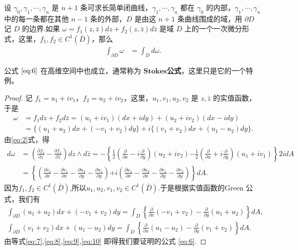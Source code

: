 \documentclass[../../main.tex]{subfiles}
\begin{document}
\begin{theorem}[Green公式]\label{theorem:Green公式-复变函数形式}
设 \( \gamma_0, \gamma_1, \cdots, \gamma_n \) 是 \( n + 1 \) 条可求长简单闭曲线，\( \gamma_1, \cdots, \gamma_n \) 都在 \( \gamma_0 \) 的内部，\( \gamma_1, \cdots, \gamma_n \) 中的每一条都在其他 \( n - 1 \) 条的外部，\( D \) 是由这 \( n + 1 \) 条曲线围成的域，用 \(\partial D \) 记 \( D \) 的边界.如果 \( \omega = f_1(z,\bar{z})dz + f_2(z,\bar{z})d\bar{z} \) 是域 \( D \) 上的一个一次微分形式，这里，\( f_1,f_2 \in C^1(\bar{D}) \)，那么
\begin{align}
\int_{\partial D} \omega &= \int_D d\omega. \label{eq:6}
\end{align}
\end{theorem}
\begin{note}
公式 \(\eqref{eq:6}\) 在高维空间中也成立，通常称为 $\mathbf{Stokes}$\textbf{公式}，这里只是它的一个特例。
\end{note}
\begin{proof}
记 \( f_1 = u_1 + iv_1 \)，\( f_2 = u_2 + iv_2 \)，这里，\( u_1,v_1,u_2,v_2 \) 是 \( z,\bar{z} \) 的实值函数，于是
\begin{align}\label{eq:7}
\omega &= f_1 dz + f_2 d\bar{z} = (u_1 + iv_1)(dx + idy) + (u_2 + iv_2)(dx - idy) \nonumber \\
&= \{(u_1 + u_2)dx + (-v_1 + v_2)dy\}+ i\{(v_1 + v_2)dx + (u_1 - u_2)dy\}.
\end{align}
由\eqref{eq:2}式，得
\begin{align}
d\omega &= \left( \frac{\partial f_2}{\partial z} - \frac{\partial f_1}{\partial \bar{z}} \right) dz \wedge d\bar{z} = -\left\{ \frac{1}{2} \left( \frac{\partial}{\partial x} - i \frac{\partial}{\partial y} \right)(u_2 + iv_2) \right. \left. - \frac{1}{2} \left( \frac{\partial}{\partial x} + i \frac{\partial}{\partial y} \right)(u_1 + iv_1) \right\} 2idA \nonumber \\
&= \left\{ \left( \frac{\partial v_2}{\partial x} - \frac{\partial v_1}{\partial x} - \frac{\partial u_2}{\partial y} - \frac{\partial u_1}{\partial y} \right) \right. \left. + i \left( \frac{\partial u_1}{\partial x} - \frac{\partial u_2}{\partial x} - \frac{\partial v_1}{\partial y} - \frac{\partial v_2}{\partial y} \right) \right\} dA. \label{eq:8}
\end{align}
因为\( f_1,f_2 \in C^1(\bar{D}) \),所以$u_1,u_2,v_1,v_2\in C^1(\bar{D})$.于是根据实值函数的Green 公式，我们有
\begin{gather}
\int_{\partial D} (u_1 + u_2)dx + (-v_1 + v_2)dy = \int_D \left\{ \frac{\partial}{\partial x}(-v_1 + v_2) - \frac{\partial}{\partial y}(u_1 + u_2) \right\} dA, \label{eq:9}
\\
\int_{\partial D} (v_1 + v_2)dx + (u_1 - u_2)dy = \int_D \left\{ \frac{\partial}{\partial x}(u_1 - u_2) - \frac{\partial}{\partial y}(v_1 + v_2) \right\} dA. \label{eq:10}
\end{gather}
由等式\eqref{eq:7},\eqref{eq:8},\eqref{eq:9},\eqref{eq:10} 即得我们要证明的公式 \eqref{eq:6}.
\end{proof}
\end{document}
